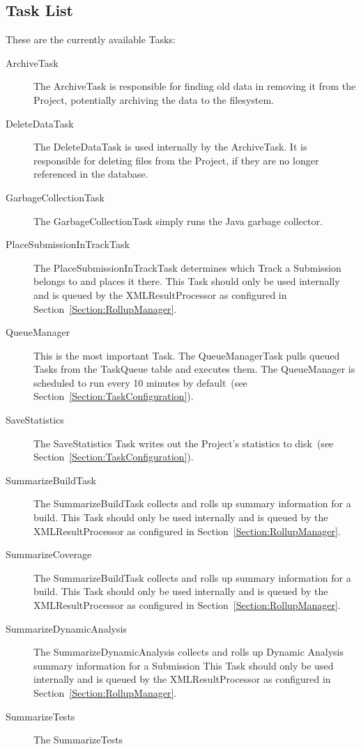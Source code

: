 \documentclass{InsightBook}
\begin{document}
\subsection{Task List}
These are the currently available Tasks:
\begin{description}
  \item[ArchiveTask] The ArchiveTask is responsible for finding old
  data in removing it from the Project, potentially archiving the data
  to the filesystem.
  \item[DeleteDataTask] The DeleteDataTask is used internally by the
  ArchiveTask.  It is responsible for deleting files from the Project,
  if they are no longer referenced in the database.
  \item[GarbageCollectionTask] The GarbageCollectionTask simply runs
  the Java garbage collector.
  \item[PlaceSubmissionInTrackTask] The PlaceSubmissionInTrackTask
  determines which Track a Submission belongs to and places it there.
  This Task should only be used internally and is queued by the
  XMLResultProcessor as configured in Section~\ref{Section:RollupManager}.
  \item[QueueManager] This is the most important Task.  The
  QueueManagerTask pulls queued Tasks from the TaskQueue table and
  executes them.  The QueueManager is scheduled to run every 10
  minutes by default~(see Section~\ref{Section:TaskConfiguration}).
  \item[SaveStatistics] The SaveStatistics Task writes out the
  Project's statistics to disk~(see Section~\ref{Section:TaskConfiguration}).
  \item[SummarizeBuildTask] The SummarizeBuildTask
  collects and rolls up summary information for a build.
  This Task should only be used internally and is queued by the
  XMLResultProcessor as configured in Section~\ref{Section:RollupManager}.
  \item[SummarizeCoverage] The SummarizeBuildTask
  collects and rolls up summary information for a build.
  This Task should only be used internally and is queued by the
  XMLResultProcessor as configured in Section~\ref{Section:RollupManager}.
  \item[SummarizeDynamicAnalysis] The SummarizeDynamicAnalysis
  collects and rolls up Dynamic Analysis summary information for a Submission
  This Task should only be used internally and is queued by the
  XMLResultProcessor as configured in Section~\ref{Section:RollupManager}.
  \item[SummarizeTests] The SummarizeTests

\end{description}
\end{document}
